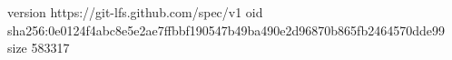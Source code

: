 version https://git-lfs.github.com/spec/v1
oid sha256:0e0124f4abc8e5e2ae7ffbbf190547b49ba490e2d96870b865fb2464570dde99
size 583317

